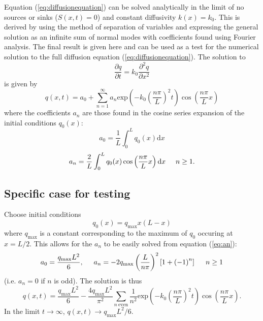 \documentclass[12pt]{article}
\begin{document}
Equation (\ref{eq:diffusionequation}) can be solved analytically in the limit of no sources or sinks ($S(x,t)=0$) and constant diffusivity $k(x)=k_0$. This is derived by using the method of separation of variables and expressing the general solution as an infinite sum of normal modes with coefficients found using Fourier analysis. The final result is given here and can be used as a test for the numerical solution to the full diffusion equation (\ref{eq:diffusionequation}). The solution to
\begin{equation}\label{eq:simplifieddiffusionequation}
\frac{\partial q}{\partial t} = k_0\frac{\partial^2q}{\partial x^2}
\end{equation}
is given by
\begin{equation}\label{eq:analyticsolution}
q(x,t) = a_0 + \sum_{n=1}^\infty a_n \mathrm{exp}\left(-k_0\left(\frac{n\pi}{L}\right)^2t\right)\cos\left(\frac{n\pi}{L}x\right)
\end{equation}
where the coefficients $a_n$ are those found in the cosine series expansion of the initial conditions $q_0(x)$:
\begin{equation}\label{eq:a0}
a_0 = \frac{1}{L}\int_0^Lq_0(x)\mathrm{d}x
\end{equation}
\begin{equation}\label{eq:an}
a_n = \frac{2}{L}\int_0^Lq_0(x)\cos\left(\frac{n\pi}{L}x\right)\mathrm{d}x\hspace{5mm} n\geq 1.
\end{equation}

\subsection{Specific case for testing}
Choose initial conditions
\begin{equation}\label{eq:initialconditionsexample}
q_0(x) = q_\mathrm{max}x(L-x)
\end{equation}
where $q_\mathrm{max}$ is a constant corresponding to the maximum of $q_0$ occuring at $x=L/2$. This allows for the $a_n$ to be easily solved from equation (\ref{eq:an}):
\begin{equation}
a_0 = \frac{q_\mathrm{max}L^2}{6},\hspace{5mm} a_n = -2q_\mathrm{max}\left(\frac{L}{n\pi}\right)^2\left[1+\left(-1\right)^n\right]\hspace{5mm} n \geq 1
\end{equation}
(i.e. $a_n=0$ if $n$ is odd). The solution is thus
\begin{equation}\label{eq:specificanalyticsolution}
q(x,t) = \frac{q_\mathrm{max}L^2}{6} -\frac{4q_\mathrm{max}L^2}{\pi^2}\sum_{n\ \mathrm{even}}\frac{1}{n^2}\mathrm{exp}\left(-k_0\left(\frac{n\pi}{L}\right)^2t\right)\cos\left(\frac{n\pi}{L}x\right).
\end{equation}
In the limit $t\rightarrow\infty$, $q(x,t)\rightarrow q_\mathrm{max}L^2/6$.
\end{document}
